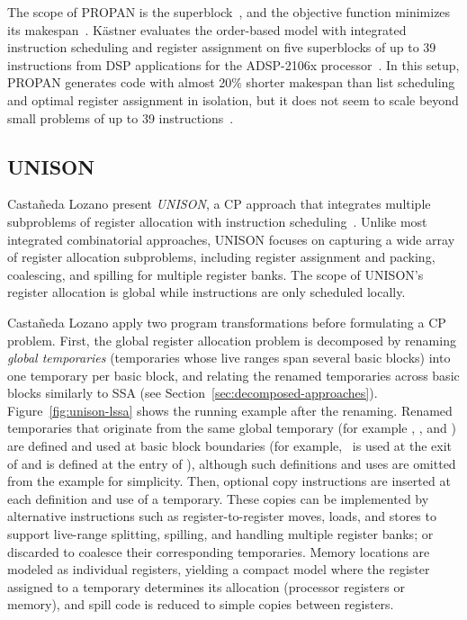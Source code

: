 \documentclass[acmsmall,authorversion,nonacm]{acmart}
\begin{document}
The scope of PROPAN is the superblock~\cite[Chapter 7]{Kastner2000b},
and the objective function minimizes its makespan~\cite[Chapter
  5]{Kastner2000b}.
K\"{a}stner evaluates the order-based model with integrated
instruction scheduling and register assignment on five superblocks of
up to 39 instructions from DSP applications for the ADSP-2106x
processor~\cite{SH}.
In this setup, PROPAN generates code with almost 20\% shorter
makespan than list scheduling and optimal register assignment in
isolation, but it does not seem to scale beyond small problems of up
to 39 instructions~\cite{Kastner2001}.

\subsection{UNISON}\label{sec:unison}

Casta\~{n}eda Lozano \etal{} present \emph{UNISON}, a CP approach that
integrates multiple subproblems of register allocation with
instruction scheduling~\cite{Castaneda2012}.
Unlike most integrated combinatorial approaches, UNISON focuses on
capturing a wide array of register allocation subproblems, including
register assignment and packing, coalescing, and spilling for multiple
register banks.
The scope of UNISON's register allocation is global while instructions
are only scheduled locally.

Casta\~{n}eda Lozano \etal{} apply two program transformations before
formulating a CP problem.
First, the global register allocation problem is decomposed by
renaming \emph{global temporaries} (temporaries whose live ranges span
several basic blocks) into one temporary per basic block, and relating
the renamed temporaries across basic blocks similarly to SSA (see
Section~\ref{sec:decomposed-approaches}).
Figure~\ref{fig:unison-lssa} shows the running example after the
renaming.
Renamed temporaries that originate from the same global temporary (for
example , , and ) are defined and
used at basic block boundaries (for example,~ is used at the
exit of  and  is defined at the entry of ),
although such definitions and uses are omitted from the example for
simplicity.
Then, optional copy instructions are inserted at each definition and
use of a temporary.
These copies can be implemented by alternative instructions such as
register-to-register moves, loads, and stores to support live-range
splitting, spilling, and handling multiple register banks; or
discarded to coalesce their corresponding temporaries.
Memory locations are modeled as individual registers, yielding a
compact model where the register assigned to a temporary determines
its allocation (processor registers or memory), and spill code is
reduced to simple copies between registers.
\end{document}

